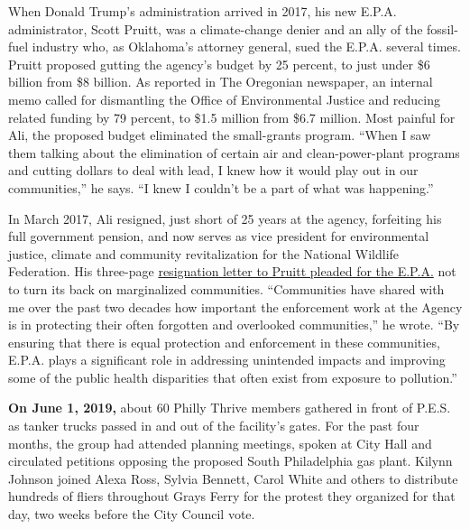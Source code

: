 When Donald Trump's administration arrived in 2017, his new E.P.A.
administrator, Scott Pruitt, was a climate-change denier and an ally of
the fossil-fuel industry who, as Oklahoma's attorney general, sued the
E.P.A. several times. Pruitt proposed gutting the agency's budget by 25
percent, to just under \$6 billion from \$8 billion. As reported in The
Oregonian newspaper, an internal memo called for dismantling the Office
of Environmental Justice and reducing related funding by 79 percent, to
\$1.5 million from \$6.7 million. Most painful for Ali, the proposed
budget eliminated the small-grants program. ``When I saw them talking
about the elimination of certain air and clean-power-plant programs and
cutting dollars to deal with lead, I knew how it would play out in our
communities,'' he says. ``I knew I couldn't be a part of what was
happening.''

In March 2017, Ali resigned, just short of 25 years at the agency,
forfeiting his full government pension, and now serves as vice president
for environmental justice, climate and community revitalization for the
National Wildlife Federation. His three-page
\href{https://www.documentcloud.org/documents/3514958-Final-Resignation-Letter-for-Administrator.html}{resignation
letter to Pruitt pleaded for the E.P.A.} not to turn its back on
marginalized communities. ``Communities have shared with me over the
past two decades how important the enforcement work at the Agency is in
protecting their often forgotten and overlooked communities,'' he wrote.
``By ensuring that there is equal protection and enforcement in these
communities, E.P.A. plays a significant role in addressing unintended
impacts and improving some of the public health disparities that often
exist from exposure to pollution.''

\textbf{On June 1, 2019,} about 60 Philly Thrive members gathered in
front of P.E.S. as tanker trucks passed in and out of the facility's
gates. For the past four months, the group had attended planning
meetings, spoken at City Hall and circulated petitions opposing the
proposed South Philadelphia gas plant. Kilynn Johnson joined Alexa Ross,
Sylvia Bennett, Carol White and others to distribute hundreds of fliers
throughout Grays Ferry for the protest they organized for that day, two
weeks before the City Council vote.

